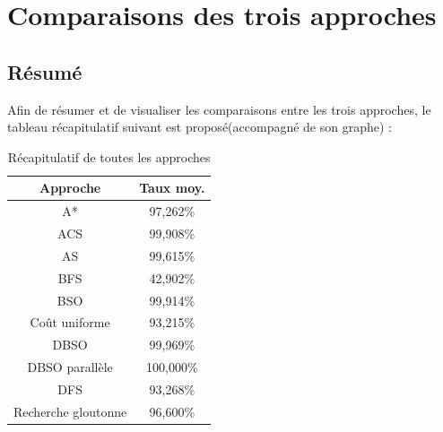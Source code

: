 \chapter{Comparaisons des trois approches}

\section{Résumé}
Afin de résumer et de visualiser les comparaisons entre les trois approches, le tableau récapitulatif suivant est proposé(accompagné de son graphe) : 
\begin{table}[H]
	\centering
		\begin{tabular}{|c|c|}
			\hline
			\textbf{Approche}   & \textbf{Taux moy.} \\ \hline
			A*                  & 97,262\%           \\ \hline
			ACS                 & 99,908\%           \\ \hline
			AS                  & 99,615\%           \\ \hline
			\rowcolor[HTML]{FD6864} 
			BFS                 & 42,902\%           \\ \hline
			BSO                 & 99,914\%           \\ \hline
			Coût uniforme       & 93,215\%           \\ \hline
			DBSO                & 99,969\%           \\ \hline
			\rowcolor[HTML]{9AFF99} 
			DBSO parallèle      & 100,000\%          \\ \hline
			DFS                 & 93,268\%           \\ \hline
			Recherche gloutonne & 96,600\%           \\ \hline
		\end{tabular}%
	\caption{Récapitulatif de toutes les approches}
	\label{my-label}
\end{table}

